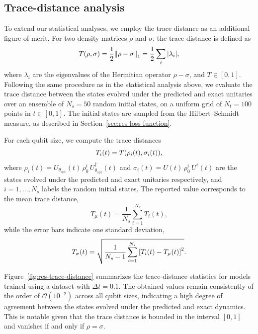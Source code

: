 \subsection{Trace-distance analysis}
\label{sec:res-trace-distance}

To extend our statistical analyses, we employ the trace distance as an additional figure of merit. For two density matrices $\rho$ and $\sigma$, the trace distance is defined as
\begin{equation}
\label{eq:res-trace-distance}
T(\rho, \sigma) = \frac{1}{2} \norm{ \rho - \sigma }_1 = \frac{1}{2} \sum_i |\lambda_i|,
\end{equation}
where $\lambda_i$ are the eigenvalues of the Hermitian operator $\rho - \sigma$, and $T \in [0,1]$. Following the same procedure as in the statistical analysis above, we evaluate the trace distance between the states evolved under the predicted and exact unitaries over an ensemble of $N_s = 50$ random initial states, on a uniform grid of $N_t = 100$ points in $t \in [0,1]$. The initial states are sampled from the Hilbert--Schmidt measure, as described in Section~\ref{sec:res-loss-function}.

For each qubit size, we compute the trace distances
\begin{equation}
  T_i(t) = T\qty(\rho_i(t),\sigma_i(t)),
\end{equation}
where $\rho_i(t) = U_{\theta_{\mathrm{opt}}}(t)\, \rho_0^i\, U_{\theta_{\mathrm{opt}}}^{\dagger}(t)$ and $\sigma_i(t) = U(t)\, \rho_0^i\, U^{\dagger}(t)$ are the states evolved under the predicted and exact unitaries respectively, and $i=1,\ldots,N_s$ labels the random initial states. The reported value corresponds to the mean trace distance,
\begin{equation}
  T_{\mu}(t)= \frac{1}{N_s} \sum_{i=1}^{N_s} T_{i}(t),
\end{equation}
while the error bars indicate one standard deviation,
\begin{equation}
  T_{\sigma}(t) = \sqrt{ \frac{1}{N_s-1} \sum_{i=1}^{N_s} \qty[T_{i}(t)-T_{\mu}(t)]^2 }.
\end{equation}

Figure~\ref{fig:res-trace-distance} summarizes the trace-distance statistics for models trained using a dataset with $\Delta t = 0.1$. The obtained values remain consistently of the order of $\mathcal{O}(10^{-2})$ across all qubit sizes, indicating a high degree of agreement between the states evolved under the predicted and exact dynamics. This is notable given that the trace distance is bounded in the interval $[0,1]$ and vanishes if and only if $\rho=\sigma$.

